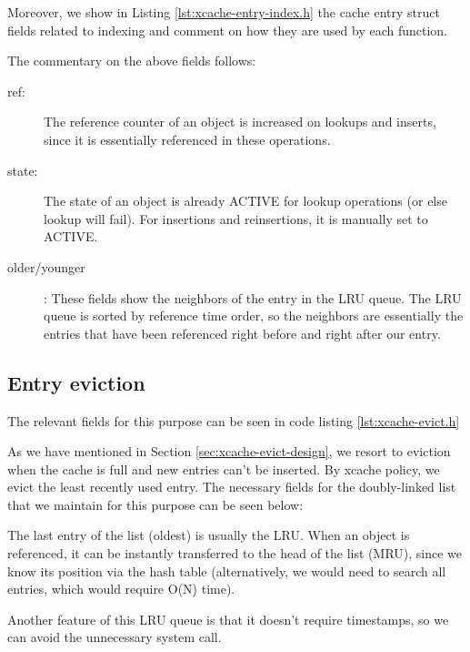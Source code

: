 Moreover, we show in Listing \ref{lst:xcache-entry-index.h} the cache entry 
struct fields related to indexing and comment on how they are used by each 
function.


The commentary on the above fields follows:

\begin{description}
	\item[ref:] The reference counter of an object is increased on lookups 
		and inserts, since it is essentially referenced in these 
		operations.
	\item[state:] The state of an object is already ACTIVE for lookup 
		operations (or else lookup will fail). For insertions and 
		reinsertions, it is manually set to ACTIVE.
	\item[older/younger]: These fields show the neighbors of the entry in 
		the LRU queue. The LRU queue is sorted by reference time order, 
		so the neighbors are essentially the entries that have been 
		referenced right before and right after our entry.
\end{description}

\subsection{Entry eviction}\label{xcache-evict-imp}

The relevant fields for this purpose can be seen in code listing 
\ref{lst:xcache-evict.h}


As we have mentioned in Section \ref{sec:xcache-evict-design}, we resort to 
eviction when the cache is full and new entries can't be inserted. By xcache 
policy, we evict the least recently used entry. The necessary fields for the 
doubly-linked list that we maintain for this purpose can be seen below:


The last entry of the list (oldest) is usually the LRU. When an object is 
referenced, it can be instantly transferred to the head of the list (MRU), 
since we know its position via the hash table (alternatively, we would need to 
search all entries, which would require O(N) time).

Another feature of this LRU queue is that it doesn't require timestamps, so we 
can avoid the unnecessary system call.

